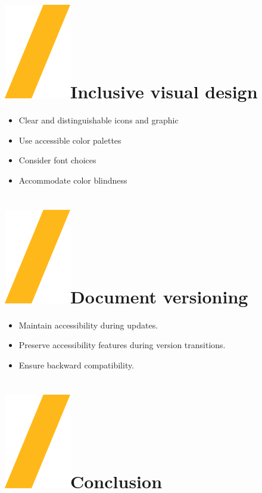 \documentclass[a0paper,fleqn]{src/betterposter}
\begin{document}
{}{

\section{\includegraphics[height=\fontcharht\font`\S]{img/general/slash.png}Inclusive visual design}

\begin{itemize}
\item Clear and distinguishable icons and graphic
\item Use accessible color palettes
\item Consider font choices
\item Accommodate color blindness
\end{itemize}

\section{\includegraphics[height=\fontcharht\font`\S]{img/general/slash.png}Document versioning}

\begin{itemize}
\item Maintain accessibility during updates.
\item Preserve accessibility features during version transitions.
\item Ensure backward compatibility.
\end{itemize}

\section{\includegraphics[height=\fontcharht\font`\S]{img/general/slash.png}Conclusion}

}
\end{document}
